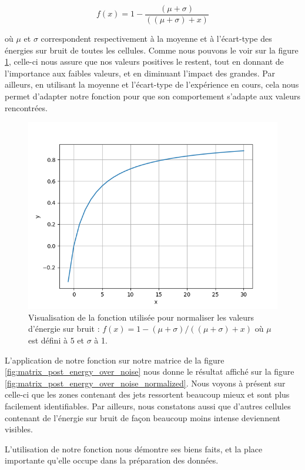 \[f(x) = 1-\frac{(\mu+\sigma)}{((\mu+\sigma)+x)}\]

où $\mu$ et $\sigma$ correspondent respectivement à la moyenne et à l'écart-type des énergies sur bruit de toutes les cellules. Comme nous pouvons le voir sur la figure \ref{fig:personalized_function}, celle-ci nous assure que nos valeurs positives le restent, tout en donnant de l'importance aux faibles valeurs, et en diminuant l'impact des grandes. Par ailleurs, en utilisant la moyenne et l'écart-type de l'expérience en cours, cela nous permet d'adapter notre fonction pour que son comportement s'adapte aux valeurs rencontrées.

\begin{figure}[hbt!]
    \centering
    \includegraphics[scale=0.7]{Figures/dataset/personalized_function.png}
    \caption{Visualisation de la fonction utilisée pour normaliser les valeurs d'énergie sur bruit : $f(x) = 1-(\mu+\sigma)/((\mu+\sigma)+x)$ où $\mu$ est défini à $5$ et $\sigma$ à 1.}
    \label{fig:personalized_function}
\end{figure}

L'application de notre fonction sur notre matrice de la figure \ref{fig:matrix_post_energy_over_noise} nous donne le résultat affiché sur la figure \ref{fig:matrix_post_energy_over_noise_normalized}. Nous voyons à présent sur celle-ci que les zones contenant des jets ressortent beaucoup mieux et sont plus facilement identifiables. Par ailleurs, nous constatons aussi que d'autres cellules contenant de l'énergie sur bruit de façon beaucoup moins intense deviennent visibles.

L'utilisation de notre fonction nous démontre ses biens faits, et la place importante qu'elle occupe dans la préparation des données.

